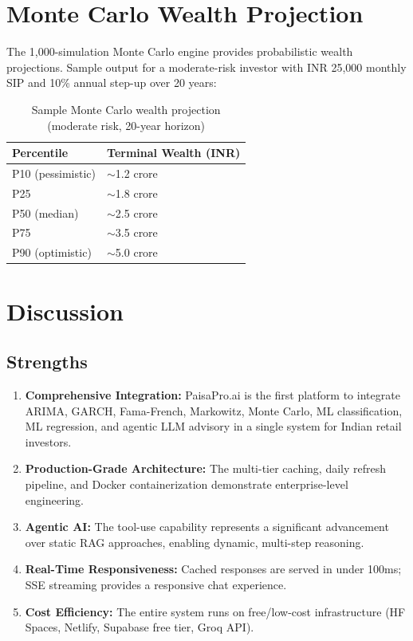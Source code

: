 \documentclass[12pt, a4paper, oneside]{report}
\newcommand{\projectname}{PaisaPro.ai}
\begin{document}
\section{Monte Carlo Wealth Projection}
\label{sec:results_montecarlo}

The 1,000-simulation Monte Carlo engine provides probabilistic wealth projections. Sample output for a moderate-risk investor with INR 25,000 monthly SIP and 10\% annual step-up over 20 years:

\begin{table}[H]
\centering
\caption{Sample Monte Carlo wealth projection (moderate risk, 20-year horizon)}
\label{tab:mc_results}
\begin{tabular}{@{}ll@{}}
\toprule
\textbf{Percentile} & \textbf{Terminal Wealth (INR)} \\
\midrule
P10 (pessimistic) & $\sim$1.2 crore \\
P25 & $\sim$1.8 crore \\
P50 (median) & $\sim$2.5 crore \\
P75 & $\sim$3.5 crore \\
P90 (optimistic) & $\sim$5.0 crore \\
\bottomrule
\end{tabular}
\end{table}

\section{Discussion}
\label{sec:discussion}

\subsection{Strengths}

\begin{enumerate}[nosep]
    \item \textbf{Comprehensive Integration:} \projectname{} is the first platform to integrate ARIMA, GARCH, Fama-French, Markowitz, Monte Carlo, ML classification, ML regression, and agentic LLM advisory in a single system for Indian retail investors.
    \item \textbf{Production-Grade Architecture:} The multi-tier caching, daily refresh pipeline, and Docker containerization demonstrate enterprise-level engineering.
    \item \textbf{Agentic AI:} The tool-use capability represents a significant advancement over static RAG approaches, enabling dynamic, multi-step reasoning.
    \item \textbf{Real-Time Responsiveness:} Cached responses are served in under 100ms; SSE streaming provides a responsive chat experience.
    \item \textbf{Cost Efficiency:} The entire system runs on free/low-cost infrastructure (HF Spaces, Netlify, Supabase free tier, Groq API).
\end{enumerate}
\end{document}
